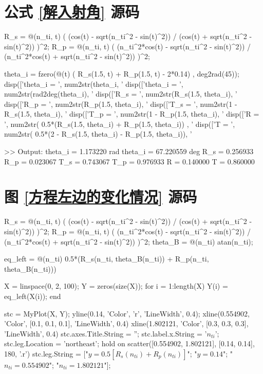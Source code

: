 \documentclass[UTF8]{report}
\theoremstyle{MyLineTheoremStyle} %
\theoremstyle{MyBlockTheoremStyle} %
\theoremstyle{MySubsubsectionStyle} %
\begin{document}
\section{公式 \ref{解入射角} 源码}\label{公式解入射角源码}

\begin{matlablisting}
R_s = @(n_ti, t) ( (cos(t) - sqrt(n_ti^2 - sin(t)^2)) / (cos(t) + sqrt(n_ti^2 - sin(t)^2)) )^2;
R_p = @(n_ti, t) ( (n_ti^2*cos(t) - sqrt(n_ti^2 - sin(t)^2)) / (n_ti^2*cos(t) + sqrt(n_ti^2 - sin(t)^2)) )^2;

theta_i = fzero(@(t) ( R_s(1.5, t) + R_p(1.5, t) - 2*0.14) , deg2rad(45));
disp(['theta_i = ', num2str(theta_i, '%
disp(['theta_i = ', num2str(rad2deg(theta_i), '%
disp(['R_s = ', num2str(R_s(1.5, theta_i), '%
disp(['R_p = ', num2str(R_p(1.5, theta_i), '%
disp(['T_s = ', num2str(1 - R_s(1.5, theta_i), '%
disp(['T_p = ', num2str(1 - R_p(1.5, theta_i), '%
disp(['R = ', num2str( 0.5*(R_s(1.5, theta_i) + R_p(1.5, theta_i)) , '%
disp(['T = ', num2str( 0.5*(2 - R_s(1.5, theta_i) - R_p(1.5, theta_i)), '%

>> Output:
theta_i = 1.173220 rad
theta_i = 67.220559 deg
R_s = 0.256933
R_p = 0.023067
T_s = 0.743067
T_p = 0.976933
R = 0.140000
T = 0.860000
\end{matlablisting}

\section{图 \ref{方程左边的变化情况} 源码}\label{方程左边的变化情况源码}

\begin{matlablisting}
R_s = @(n_ti, t) ( (cos(t) - sqrt(n_ti^2 - sin(t)^2)) / (cos(t) + sqrt(n_ti^2 - sin(t)^2)) )^2;
R_p = @(n_ti, t) ( (n_ti^2*cos(t) - sqrt(n_ti^2 - sin(t)^2)) / (n_ti^2*cos(t) + sqrt(n_ti^2 - sin(t)^2)) )^2;
theta_B = @(n_ti) atan(n_ti);

eq_left = @(n_ti) 0.5*(R_s(n_ti, theta_B(n_ti)) + R_p(n_ti, theta_B(n_ti)))

X = linspace(0, 2, 100);
Y = zeros(size(X));
for i = 1:length(X)
    Y(i) = eq_left(X(i));
end

stc = MyPlot(X, Y);
yline(0.14, 'Color', 'r', 'LineWidth', 0.4);
xline(0.554902, 'Color', [0.1, 0.1, 0.1], 'LineWidth', 0.4)
xline(1.802121, 'Color', [0.3, 0.3, 0.3], 'LineWidth', 0.4)
stc.axes.Title.String = '';
stc.label.x.String = '$n_{ti}$';
stc.leg.Location = 'northeast';
hold on
scatter([0.554902, 1.802121], [0.14, 0.14], 180, '.r')
stc.leg.String = ["$y =  0.5\left[ R_s(n_{ti}) + R_p(n_{ti}) \right]$"; "$y = 0.14$"; "$n_{ti} = 0.554902$"; "$n_{ti} = 1.802121$"];
\end{matlablisting}

\end{document}
